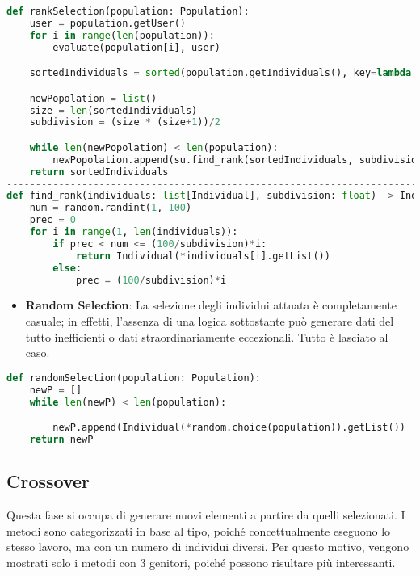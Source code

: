 \documentclass{article}
\begin{document}
\begin{lstlisting}[language=Python, breaklines, no caption]
def rankSelection(population: Population):
    user = population.getUser()
    for i in range(len(population)):
        evaluate(population[i], user)

    sortedIndividuals = sorted(population.getIndividuals(), key=lambda ind: ind.fitness())

    newPopolation = list()
    size = len(sortedIndividuals)
    subdivision = (size * (size+1))/2

    while len(newPopolation) < len(population):
        newPopolation.append(su.find_rank(sortedIndividuals, subdivision))
    return sortedIndividuals
---------------------------------------------------------------------------------------
def find_rank(individuals: list[Individual], subdivision: float) -> Individual:
    num = random.randint(1, 100)
    prec = 0
    for i in range(1, len(individuals)):
        if prec < num <= (100/subdivision)*i:
            return Individual(*individuals[i].getList())
        else:
            prec = (100/subdivision)*i
\end{lstlisting}

\pagebreak

\begin{itemize}

\item\textbf{Random Selection}: La selezione degli individui attuata è completamente casuale; in effetti, l'assenza di una logica sottostante può generare dati del tutto inefficienti o dati straordinariamente eccezionali. Tutto è lasciato al caso.

\end{itemize}

\begin{lstlisting}[language=Python, breaklines, no caption]
def randomSelection(population: Population):
    newP = []
    while len(newP) < len(population):

        newP.append(Individual(*random.choice(population)).getList())
    return newP
        \end{lstlisting}

\subsection{Crossover}

Questa fase si occupa di generare nuovi elementi a partire da quelli selezionati. I metodi sono categorizzati in base al tipo, poiché concettualmente eseguono lo stesso lavoro, ma con un numero di individui diversi. Per questo motivo, vengono mostrati solo i metodi con 3 genitori, poiché possono risultare più interessanti.
\end{document}

